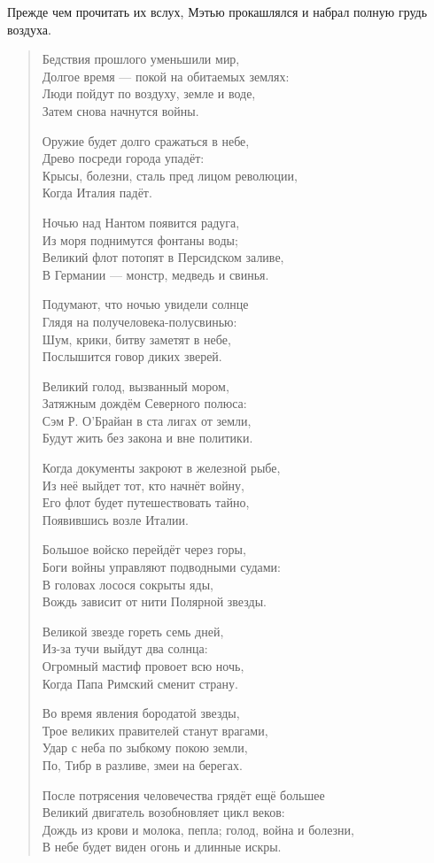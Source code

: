 \documentclass[a5paper, 9pt,
final, openany, twoside=true]{memoir}
\begin{document}
Прежде чем прочитать их вслух, Мэтью прокашлялся и набрал полную грудь воздуха.
\begin{quote}
Бедствия прошлого уменьшили мир,\\
Долгое время — покой на обитаемых землях:\\
Люди пойдут по воздуху, земле и воде,\\
Затем снова начнутся войны.\bigskip

Оружие будет долго сражаться в небе,\\
Древо посреди города упадёт:\\
Крысы, болезни, сталь пред лицом революции,\\
Когда Италия падёт.\bigskip

Ночью над Нантом появится радуга,\\
Из моря поднимутся фонтаны воды;\\
Великий флот потопят в Персидском заливе,\\
В Германии — монстр, медведь и свинья.\bigskip

Подумают, что ночью увидели солнце\\
Глядя на получеловека-полусвинью:\\
Шум, крики, битву заметят в небе,\\
Послышится говор диких зверей.\bigskip

Великий голод, вызванный мором,\\
Затяжным дождём Северного полюса:\\
Сэм Р. О’Брайан в ста лигах от земли,\\
Будут жить без закона и вне политики.\bigskip

Когда документы закроют в железной рыбе,\\
Из неё выйдет тот, кто начнёт войну,\\
Его флот будет путешествовать тайно,\\
Появившись возле Италии.\bigskip

Большое войско перейдёт через горы,\\
Боги войны управляют подводными судами:\\
В головах лосося сокрыты яды,\\
Вождь зависит от нити Полярной звезды.\bigskip

Великой звезде гореть семь дней,\\
Из-за тучи выйдут два солнца:\\
Огромный мастиф провоет всю ночь,\\
Когда Папа Римский сменит страну.\bigskip

Во время явления бородатой звезды,\\
Трое великих правителей станут врагами,\\
Удар с неба по зыбкому покою земли,\\
По, Тибр в разливе, змеи на берегах.\bigskip

После потрясения человечества грядёт ещё большее\\
Великий двигатель возобновляет цикл веков:\\
Дождь из крови и молока, пепла; голод, война и болезни,\\
В небе будет виден огонь и длинные искры.\bigskip
\end{quote}
\end{document}
